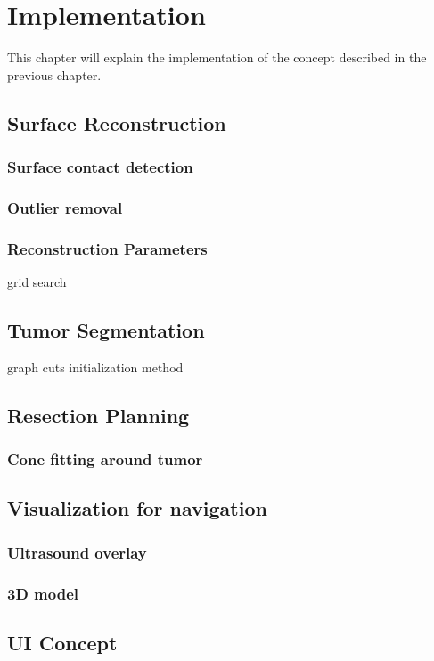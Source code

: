 \chapter{Implementation}
This chapter will explain the implementation of the concept described in the
previous chapter.
\section{Surface Reconstruction}

\subsection{Surface contact detection}
\subsection{Outlier removal}
\subsection{Reconstruction Parameters}
grid search
\section{Tumor Segmentation}
graph cuts
initialization method
\section{Resection Planning}
\subsection{Cone fitting around tumor}
\section{Visualization for navigation}
\subsection{Ultrasound overlay}
\subsection{3D model}
\section{UI Concept}
